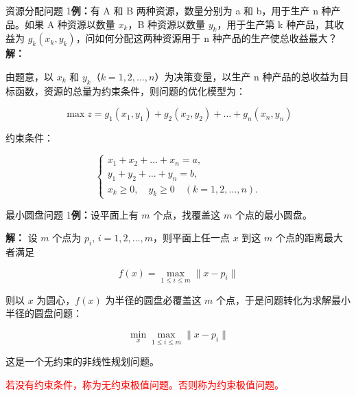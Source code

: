 \begin{exbox}{资源分配问题}
1\textbf{例：}有 A 和 B 两种资源，数量分别为 a 和 b，用于生产 n 种产品。如果 A 种资源以数量 \(x_k\)，B 种资源以数量 \(y_k\)，用于生产第 k 种产品，其收益为 \(g_k(x_k, y_k)\)，问如何分配这两种资源用于 n 种产品的生产使总收益最大？
\\
\textbf{解：}

由题意，以 \(x_k\) 和 \(y_k\)（\(k = 1, 2, \dots, n\)）为决策变量，以生产 n 种产品的总收益为目标函数，资源的总量为约束条件，则问题的优化模型为：

\[
\max z = g_1(x_1, y_1) + g_2(x_2, y_2) + \dots + g_n(x_n, y_n)
\]

约束条件：

\[
\begin{cases}
x_1 + x_2 + \dots + x_n = a, \\
y_1 + y_2 + \dots + y_n = b, \\
x_k \geq 0, \quad y_k \geq 0 \quad (k = 1, 2, \dots, n).
\end{cases}
\]
\end{exbox}

\begin{exbox}{最小圆盘问题}
    1\textbf{例：}设平面上有 $m$ 个点，找覆盖这 $m$ 个点的最小圆盘。

    \textbf{解：} 设 $m$ 个点为 $p_i, \, i = 1, 2, \dots, m$，则平面上任一点 $x$ 到这 $m$ 个点的距离最大者满足
    
    \[
    f(x) = \max_{1 \leq i \leq m} \| x - p_i \|
    \]
    
    则以 $x$ 为圆心，$f(x)$ 为半径的圆盘必覆盖这 $m$ 个点，于是问题转化为求解最小半径的圆盘问题：
    
    \[
    \min_x \max_{1 \leq i \leq m} \| x - p_i \|
    \]
    
    这是一个无约束的非线性规划问题。
\end{exbox}
\textcolor{red}{若没有约束条件，称为无约束极值问题。否则称为约束极值问题。}
